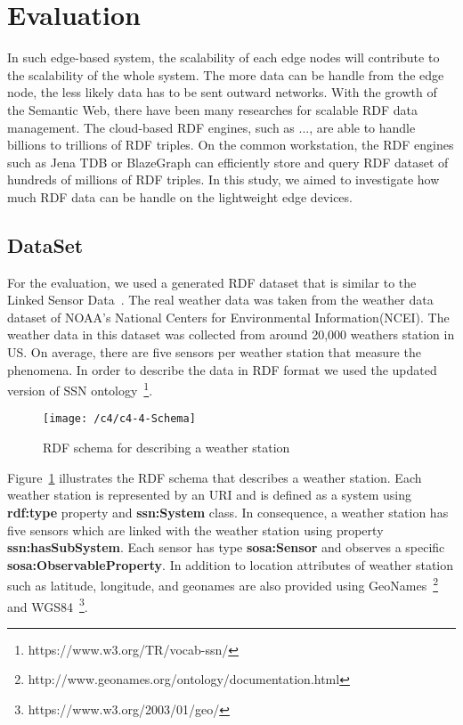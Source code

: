 \section{Evaluation}

In such edge-based system, the scalability of each edge nodes will contribute to the scalability of the whole system.
The more data can be handle from the edge node, the less likely data has to be sent outward networks.
With the growth of the Semantic Web, there have been many researches for scalable RDF data management.
The cloud-based RDF engines, such as ..., are able to handle billions to trillions of RDF triples.
On the common workstation, the RDF engines such as Jena TDB or BlazeGraph can efficiently store and query RDF dataset of hundreds of millions of RDF triples.
In this study, we aimed to investigate how much RDF data can be handle on the lightweight edge devices.

\subsection{DataSet}

For the evaluation, we used a generated RDF dataset that is similar to the Linked Sensor Data~\citep{}.
The real weather data was taken from the weather data dataset of NOAA's National Centers for Environmental Information(NCEI).
The weather data in this dataset was collected from around 20,000 weathers station in US.
On average, there are five sensors per weather station that measure the phenomena.
In order to describe the data in RDF format we used the updated version of SSN ontology~\footnote{https://www.w3.org/TR/vocab-ssn/}.

\begin{figure}[ht!]
    \centering
    \texttt{[image: /c4/c4-4-Schema]}
    \caption{RDF schema for describing a weather station}
    \label{fig:4-3-weather-station}
\end{figure}


Figure~\ref{fig:4-3-weather-station} illustrates the RDF schema that describes a weather station.
Each weather station is represented by an URI and is defined as a system using \textbf{rdf:type} property and \textbf{ssn:System} class.
In consequence, a weather station has five sensors which are linked with the weather station using property \textbf{ssn:hasSubSystem}.
Each sensor has type \textbf{sosa:Sensor} and observes a specific \textbf{sosa:ObservableProperty}.
In addition to location attributes of weather station such as latitude, longitude, and geonames are also provided using GeoNames~\footnote{http://www.geonames.org/ontology/documentation.html} and WGS84~\footnote{https://www.w3.org/2003/01/geo/}.

